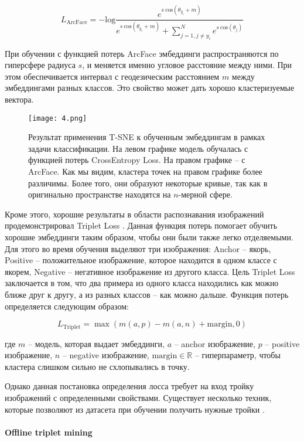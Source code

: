 $$
L_{\text{ArcFace}} = - \text{log} \frac{e^{s\:\text{cos}(\theta_{y_i} + m)}}
{e^{s\:\text{cos}(\theta_{y_i} + m)} + \sum^{N}_{j=1, j \neq y_i} e^{s\:\text{cos}(\theta_j)}}
$$
\smallskip

При обучении с функцией потерь ArcFace эмбеддинги распространяются по гиперсфере радиуса $s$, и меняется именно угловое расстояние между ними. При этом обеспечивается интервал с геодезическим расстоянием $m$ между эмбеддингами разных классов. Это свойство может дать хорошо кластеризуемые вектора.

\begin{figure}[htbp]
    \centering
    \texttt{[image: 4.png]}
    \captionsetup{width=0.9\textwidth}
    \caption{Результат применения T-SNE к обученным эмбеддингам в рамках задачи классификации. На левом графике модель обучалась с функцией потерь CrossEntropy Loss. На правом графике -- с ArcFace. Как мы видим, кластера точек на правом графике более различимы. Более того, они образуют некоторые кривые, так как в оригинально пространстве находятся на $n$-мерной сфере.}
    \label{fig:ce_vs_arcface}
\end{figure}

Кроме этого, хорошие результаты в области распознавания изображений продемонстрировал Triplet Loss \cite{triplet_loss}\cite{netvlad}. Данная функция потерь помогает обучить хорошие эмбеддинги таким образом, чтобы они были также легко отделяемыми. Для этого во время обучения выделяют три изображения: Anchor -- якорь, Positive -- положительное изображение, которое находится в одном классе с якорем, Negative -- негативное изображение из другого класса. Цель Triplet Loss заключается в том, что два примера из одного класса находились как можно ближе друг к другу, а из разных классов -- как можно дальше. Функция потерь определяется следующим образом:

$$
L_{\text{Triplet}} = \max(m(a, p) - m(a, n) + \text{margin}, 0)
$$

\noindent
где $m$ -- модель, которая выдает эмбеддинги, $a$ -- anchor изображение, $p$ -- positive изображение, $n$ -- negative изображение, $\text{margin} \in \mathbb{R}$ -- гиперпараметр, чтобы кластера слишком сильно не схлопывались в точку.

Однако данная постановка определения лосса требует на вход тройку изображений с определенными свойствами. Существует несколько техник, которые позволяют из датасета при обучении получить нужные тройки \cite{tiplet_online}.

\paragraph{Offline triplet mining}\mbox{} \\

